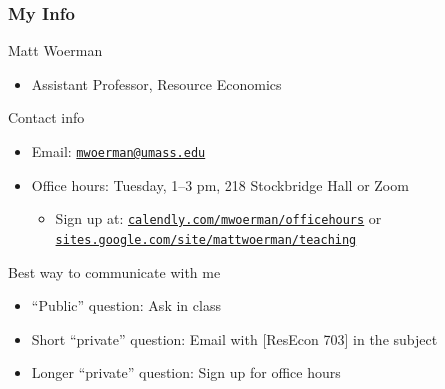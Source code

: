\documentclass{beamer}
\begin{document}
\begin{frame}\frametitle{My Info}
    Matt Woerman
    \begin{itemize}
        \item Assistant Professor, Resource Economics
    \end{itemize}
    \vspace{2ex}
    Contact info
    \begin{itemize}
        \item Email: \href{mailton:mwoerman@umass.edu}{\texttt{mwoerman@umass.edu}}
        \item Office hours: Tuesday, 1--3 pm, 218 Stockbridge Hall or Zoom
        \begin{itemize}
        	\item Sign up at: \href{https://calendly.com/mwoerman/officehours}{\texttt{calendly.com/mwoerman/officehours}} or \href{https://sites.google.com/site/mattwoerman/teaching}{\texttt{sites.google.com/site/mattwoerman/teaching}}
        \end{itemize}
    \end{itemize}
    \vspace{2ex}
    Best way to communicate with me
    \begin{itemize}
        \item ``Public'' question: Ask in class
        \item Short ``private'' question: Email with [ResEcon 703] in the subject
        \item Longer ``private'' question: Sign up for office hours
    \end{itemize}
\end{frame}
\end{document}
